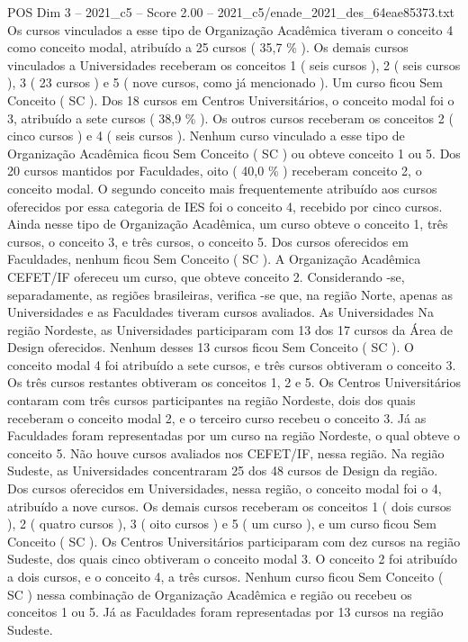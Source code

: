 \begin{textsample}{POS Dim 3 – 2021\_c5 – Score 2.00 – 2021\_c5/enade\_2021\_des\_64eae85373.txt}
Os cursos vinculados a esse tipo de Organização Acadêmica tiveram o conceito 4 como conceito modal, atribuído a 25 cursos ( 35,7 \% ).
Os demais cursos vinculados a Universidades receberam os conceitos 1 ( seis cursos ), 2 ( seis cursos ), 3 ( 23 cursos ) e 5 ( nove cursos, como já mencionado ).
Um curso ficou Sem Conceito ( SC ).
Dos 18 cursos em Centros Universitários, o conceito modal foi o 3, atribuído a sete cursos ( 38,9 \% ).
Os outros cursos receberam os conceitos 2 ( cinco cursos ) e 4 ( seis cursos ).
Nenhum curso vinculado a esse tipo de Organização Acadêmica ficou Sem Conceito ( SC ) ou obteve conceito 1 ou 5.
Dos 20 cursos mantidos por Faculdades, oito ( 40,0 \% ) receberam conceito 2, o conceito modal.
O segundo conceito mais frequentemente atribuído aos cursos oferecidos por essa categoria de IES foi o conceito 4, recebido por cinco cursos.
Ainda nesse tipo de Organização Acadêmica, um curso obteve o conceito 1, três cursos, o conceito 3, e três cursos, o conceito 5.
Dos cursos oferecidos em Faculdades, nenhum ficou Sem Conceito ( SC ).
A Organização Acadêmica CEFET/IF ofereceu um curso, que obteve conceito 2.
Considerando -se, separadamente, as regiões brasileiras, verifica -se que, na região Norte, apenas as Universidades e as Faculdades tiveram cursos avaliados.
As Universidades Na região Nordeste, as Universidades participaram com 13 dos 17 cursos da Área de Design oferecidos.
Nenhum desses 13 cursos ficou Sem Conceito ( SC ).
O conceito modal 4 foi atribuído a sete cursos, e três cursos obtiveram o conceito 3.
Os três cursos restantes obtiveram os conceitos 1, 2 e 5.
Os Centros Universitários contaram com três cursos participantes na região Nordeste, dois dos quais receberam o conceito modal 2, e o terceiro curso recebeu o conceito 3.
Já as Faculdades foram representadas por um curso na região Nordeste, o qual obteve o conceito 5.
Não houve cursos avaliados nos CEFET/IF, nessa região.
Na região Sudeste, as Universidades concentraram 25 dos 48 cursos de Design da região.
Dos cursos oferecidos em Universidades, nessa região, o conceito modal foi o 4, atribuído a nove cursos.
Os demais cursos receberam os conceitos 1 ( dois cursos ), 2 ( quatro cursos ), 3 ( oito cursos ) e 5 ( um curso ), e um curso ficou Sem Conceito ( SC ).
Os Centros Universitários participaram com dez cursos na região Sudeste, dos quais cinco obtiveram o conceito modal 3.
O conceito 2 foi atribuído a dois cursos, e o conceito 4, a três cursos.
Nenhum curso ficou Sem Conceito ( SC ) nessa combinação de Organização Acadêmica e região ou recebeu os conceitos 1 ou 5.
Já as Faculdades foram representadas por 13 cursos na região Sudeste.

\end{textsample}
